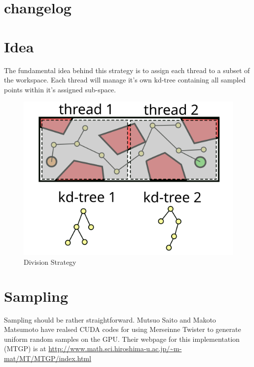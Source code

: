
\maketitle

\section{changelog}



\section{Idea}

The fundamental idea behind this strategy is to assign each thread to a subset of the workspace. Each thread will manage it's own kd-tree containing all sampled points within it's assigned sub-space. 

\begin{figure}[H]
\begin{centering}
    \includegraphics[scale=1]{fig/thread_kdtree}
    \caption{Division Strategy}
\end{centering}
\end{figure}

\section{Sampling}

Sampling should be rather straightforward. Mutsuo Saito and Makoto Matsumoto have realsed CUDA codes for using Merseinne Twister to generate uniform random samples on the GPU. Their webpage for this implementation (MTGP) is at \url{http://www.math.sci.hiroshima-u.ac.jp/~m-mat/MT/MTGP/index.html}

